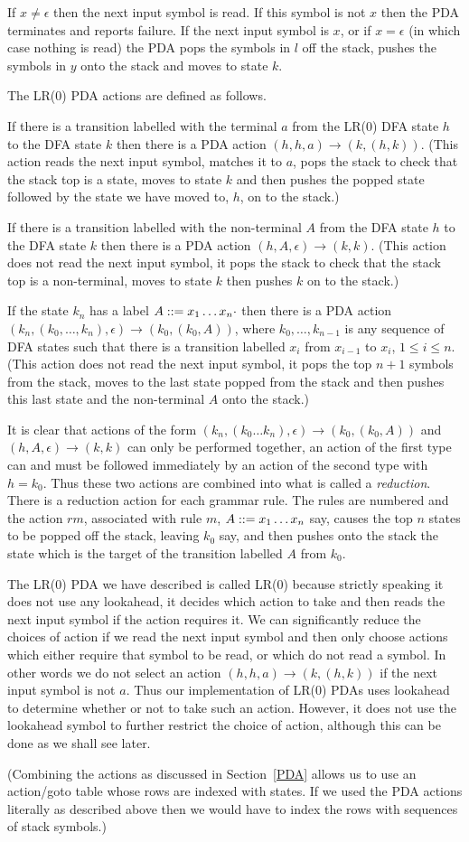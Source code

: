 If $x\not=\epsilon$ then the next input symbol is read. If this symbol
is not $x$ then the PDA terminates and reports failure. If the next
input symbol is $x$, or if $x=\epsilon$ (in which case nothing is
read) the PDA pops the symbols in $l$ off the stack, pushes the symbols in
$y$ onto the stack and moves to state $k$.

The LR(0) PDA actions are defined as follows.

If there is a transition labelled with the terminal $a$
from the LR(0) DFA state $h$ to the DFA state $k$
then there is a PDA action $(h,h,a)\to(k,(h,k))$. (This action
reads the next input symbol, matches it to $a$, pops the
stack to check that the stack top is a state, moves to state $k$ and
then pushes the popped
state followed by the state we have moved to, $h$, on to the stack.)

If there is a transition labelled with the non-terminal $A$
from the DFA state $h$ to the DFA state $k$
then there is a PDA action $(h,A,\epsilon)\to(k,k)$.
(This action does not read the next input symbol, it pops the
stack to check that the stack top is a non-terminal, moves to state $k$
then pushes $k$ on to the stack.)

If the state $k_n$ has a label $A::= x_1\ldots x_n\cdot$ 
then there is a PDA action 
$(k_n,(k_0,\ldots,k_n),\epsilon)\to(k_0,(k_0,A))$, 
where $k_0, \ldots,k_{n-1}$ is any sequence of DFA states 
such that there is a transition labelled $x_i$ from $x_{i-1}$ to 
$x_i$, $1\leq i\leq n$.
(This action does not
read the next input symbol, it pops the top $n+1$ symbols from the
stack, moves to the last state popped from the stack and then pushes
this last state and the non-terminal $A$ onto the stack.)


It is clear that actions of the form 
$(k_n,(k_0\ldots k_n),\epsilon)\to(k_0,(k_0,A))$ and
$(h,A,\epsilon)\to(k,k)$ can only be performed together, an action of the
first type can and must be followed immediately by an action of
the second type with $h=k_0$. 
Thus these two actions are combined into what is
called a {\em reduction}. There is a reduction action for each grammar
rule. The rules are numbered and the action $rm$, associated with rule
$m$, $A::= x_1\ldots x_n$ say, causes the top $n$ states to be popped
off the stack, leaving $k_0$ say, and then pushes onto the stack 
the state which is the target of the transition labelled $A$ from
$k_0$. 

The LR(0) PDA we have described is called LR(0) because strictly
speaking it does not use any lookahead, it decides which action to
take and then reads the next input symbol if the action requires it.
We can significantly reduce the choices of action if we read the next
input symbol and then only choose actions which either require that
symbol to be read, or which do not read a symbol. In other words we do
not select an action $(h,h,a)\to(k,(h,k))$ if the next input symbol
is not $a$. Thus our implementation of LR(0) PDAs uses lookahead to
determine whether or not to take such an action. However, it does not
use the lookahead symbol to further restrict the choice of action,
although this can be done as we shall see later.


(Combining the actions as discussed in Section~\ref{PDA} allows us to use an
action/goto table whose rows are indexed with states. If we used the 
PDA actions literally as described above then we would have to index 
the rows with sequences of stack symbols.)
